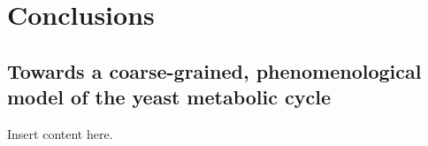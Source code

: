 \chapter{Conclusions}

\section{Towards a coarse-grained, phenomenological model of the yeast metabolic cycle}

Insert content here.
